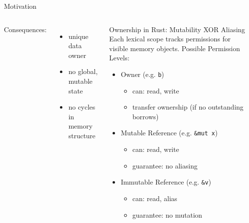 \documentclass{sdqbeamer}
\newcommand{\code}[1]{\texttt{#1}}
\begin{document}
\begin{frame}[fragile]{Motivation}{}
  \begin{columns}
      Consequences:
      \begin{itemize}
        \item unique data owner
        \item no global, mutable state
        \item no cycles in memory structure
      \end{itemize}

    \begin{greenblock}{Ownership in Rust: Mutability XOR Aliasing}
      Each lexical scope tracks permissions for visible memory objects.
      Possible Permission Levels:
      \begin{itemize}
        \item Owner (e.g. \code{b})
          \begin{itemize}
            \item can: read, write
            \item transfer ownership (if no outstanding borrows)
          \end{itemize}
        \item Mutable Reference (e.g. \code{\&mut x})
          \begin{itemize}
            \item can: read, write
            \item guarantee: no aliasing
          \end{itemize}
        \item Immutable Reference (e.g. \code{\&v})
          \begin{itemize}
            \item can: read, alias
            \item guarantee: no mutation
          \end{itemize}

\end{itemize}
\end{greenblock}
\end{columns}
\end{frame}
\end{document}
